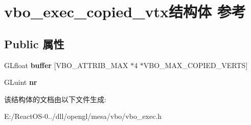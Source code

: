 \hypertarget{structvbo__exec__copied__vtx}{}\section{vbo\+\_\+exec\+\_\+copied\+\_\+vtx结构体 参考}
\label{structvbo__exec__copied__vtx}
\subsection*{Public 属性}
\begin{DoxyCompactItemize}
\item 
\mbox{\label{structvbo__exec__copied__vtx_a2ea1769f15a2ecc36db9e2535707f21f}} 
G\+Lfloat {\bfseries buffer} \mbox{[}V\+B\+O\+\_\+\+A\+T\+T\+R\+I\+B\+\_\+\+M\+AX $\ast$4 $\ast$V\+B\+O\+\_\+\+M\+A\+X\+\_\+\+C\+O\+P\+I\+E\+D\+\_\+\+V\+E\+R\+TS\mbox{]}
\item 
\mbox{\label{structvbo__exec__copied__vtx_a5acb2f16a87b64df8a31a58c716a0d5e}} 
G\+Luint {\bfseries nr}
\end{DoxyCompactItemize}


该结构体的文档由以下文件生成\+:\begin{DoxyCompactItemize}
\item 
E\+:/\+React\+O\+S-\/0../dll/opengl/mesa/vbo/vbo\+\_\+exec.\+h\end{DoxyCompactItemize}
